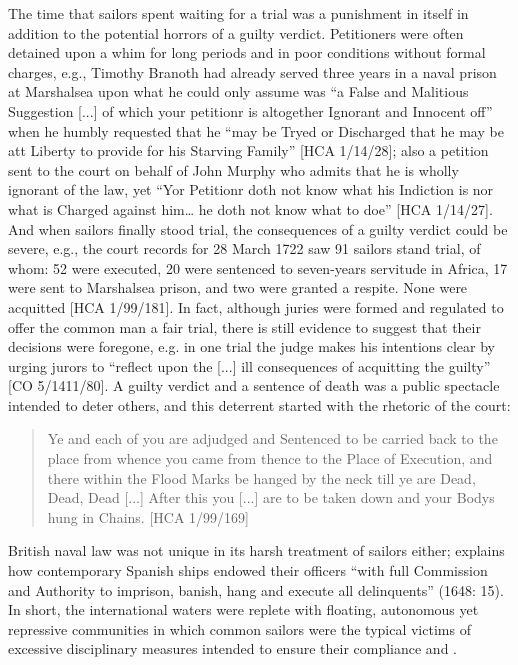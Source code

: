 The time that sailors spent waiting for a trial was a punishment in itself in addition to the potential horrors of a guilty verdict. Petitioners were often detained upon a whim for long periods and in poor conditions without formal charges, e.g., Timothy Branoth had already served three years in a naval prison at Marshalsea upon what he could only assume was “a False and Malitious Suggestion [...] of which your petitionr is altogether Ignorant and Innocent off” when he humbly requested that he “may be Tryed or Discharged that he may be att Liberty to provide for his Starving Family” [HCA 1/14/28]; also a petition sent to the court on behalf of John Murphy who admits that he is wholly ignorant of the law, yet “Yor Petitionr doth not know what his Indiction is nor what is Charged against him… he doth not know what to doe” [HCA 1/14/27]. And when sailors finally stood trial, the consequences of a guilty verdict could be severe, e.g., the court records for 28 {March 1722} saw 91 sailors stand trial, of whom: 52 were executed, 20 were sentenced to seven-years servitude in Africa, 17 were sent to Marshalsea prison, and two were granted a respite. None were acquitted [HCA 1/99/181]. In fact, although juries were formed and regulated to offer the common man a fair trial, there is still evidence to suggest that their decisions were foregone, e.g. in one trial the judge makes his intentions clear by urging jurors to “reflect upon the [...] ill consequences of acquitting the guilty” [CO 5/1411/80]. A guilty verdict and a sentence of death was a public spectacle intended to deter others, and this deterrent started with the rhetoric of the court: 

\begin{quotation}
Ye and each of you are adjudged and Sentenced to be carried back to the place from whence you came from thence to the Place of Execution, and there within the Flood Marks be hanged by the neck till ye are Dead, Dead, Dead [...] After this you [...] are to be taken down and your Bodys hung in Chains. [HCA 1/99/169] 
\end{quotation}

British naval law was not unique in its harsh treatment of sailors either; \citeauthor{Gage1648} explains how contemporary Spanish ships endowed their officers “with full Commission and Authority to imprison, banish, hang and execute all delinquents” (1648: 15). In short, the international waters were replete with floating, auton\-o\-mous yet repressive communities in which common sailors were the typical victims of excessive disciplinary measures intended to ensure their compliance and . 

